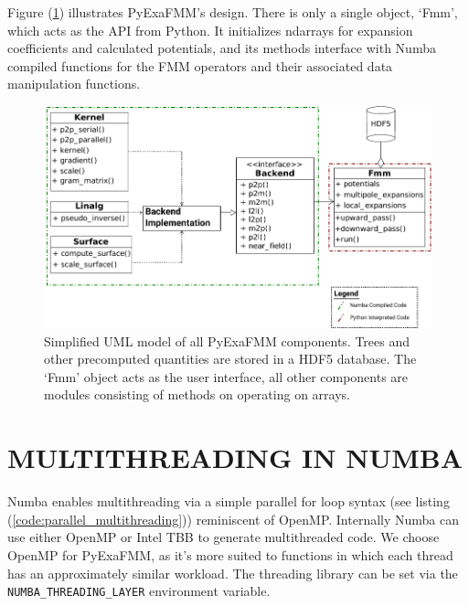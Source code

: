 \documentclass{IEEEcsmag}
\begin{document}
Figure (\ref{fig:design}) illustrates PyExaFMM's design. There is only a single object, `Fmm', which acts as the API from Python. It initializes ndarrays for expansion coefficients and calculated potentials, and its methods interface with Numba compiled functions for the FMM operators and their associated data manipulation functions.

\begin{figure}
    \centerline{\includegraphics {figures/software.pdf}}
    \caption{Simplified UML model of all PyExaFMM components. Trees and other precomputed quantities are stored in a HDF5 database. The `Fmm' object acts as the user interface, all other components are modules consisting of methods on operating on arrays.}
    \label{fig:design}
\end{figure}

\section{MULTITHREADING IN NUMBA}

Numba enables multithreading via a simple parallel for loop syntax (see listing (\ref{code:parallel_multithreading})) reminiscent of OpenMP. Internally Numba can use either OpenMP or Intel TBB to generate multithreaded code. We choose OpenMP for PyExaFMM, as it's more suited to functions in which each thread has an approximately similar workload. The threading library can be set via the \lstinline{NUMBA_THREADING_LAYER} environment variable.
\end{document}
